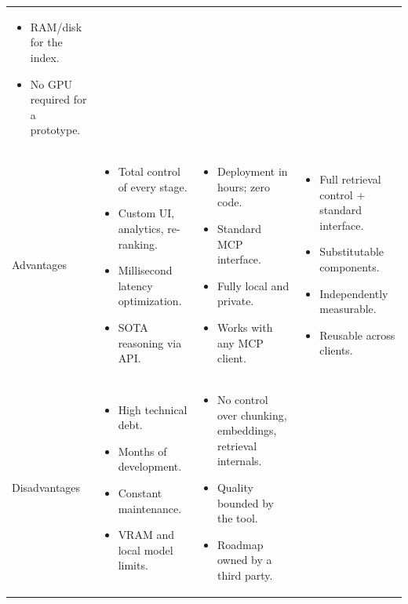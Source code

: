 \documentclass[11pt,a4paper]{article}
\begin{document}
\begin{longtable}{>{\raggedright\arraybackslash}p{2.2cm}>{\raggedright\arraybackslash}p{4.2cm}>{\raggedright\arraybackslash}p{4.2cm}>{\raggedright\arraybackslash}p{4.2cm}}
\begin{itemize}[leftmargin=1.2em, nosep, topsep=0pt]
  \item RAM/disk for the index.
  \item No GPU required for a prototype.
\end{itemize} \\
Advantages &
\begin{itemize}[leftmargin=1.2em, nosep, topsep=0pt]
  \item Total control of every stage.
  \item Custom UI, analytics, re-ranking.
  \item Millisecond latency optimization.
  \item SOTA reasoning via API.
\end{itemize} &
\begin{itemize}[leftmargin=1.2em, nosep, topsep=0pt]
  \item Deployment in hours; zero code.
  \item Standard MCP interface.
  \item Fully local and private.
  \item Works with any MCP client.
\end{itemize} &
\begin{itemize}[leftmargin=1.2em, nosep, topsep=0pt]
  \item Full retrieval control + standard interface.
  \item Substitutable components.
  \item Independently measurable.
  \item Reusable across clients.
\end{itemize} \\
Disadvantages &
\begin{itemize}[leftmargin=1.2em, nosep, topsep=0pt]
  \item High technical debt.
  \item Months of development.
  \item Constant maintenance.
  \item VRAM and local model limits.
\end{itemize} &
\begin{itemize}[leftmargin=1.2em, nosep, topsep=0pt]
  \item No control over chunking, embeddings, retrieval internals.
  \item Quality bounded by the tool.
  \item Roadmap owned by a third party.
\end{itemize} &
\begin{itemize}[leftmargin=1.2em, nosep, topsep=0pt]

\end{itemize}
\end{longtable}
\end{document}
